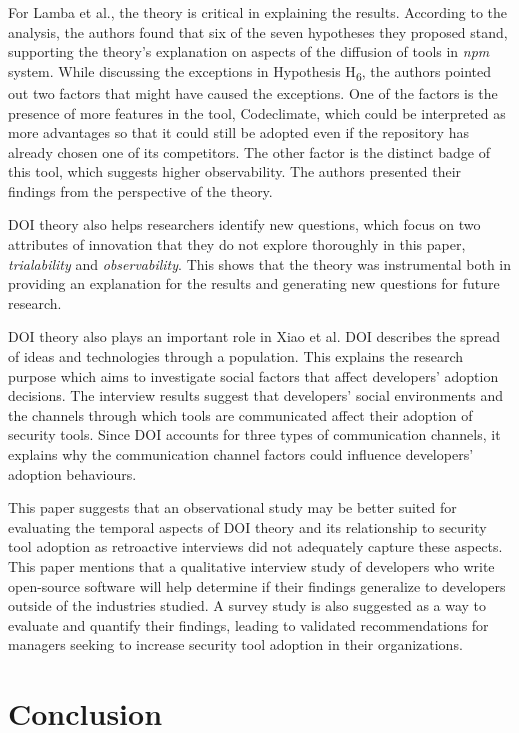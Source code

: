 \documentclass[journal,12pt,onecolumn,]{IEEEtran}
\begin{document}
For Lamba et al., the theory is critical in explaining the results. According to the analysis, the authors found that six of the seven hypotheses they proposed
stand, supporting the theory's explanation on aspects of the diffusion of tools in \textit{npm} system.
While discussing the exceptions in Hypothesis H\textsubscript{6}, the authors pointed out two factors that might have caused the exceptions. One of the factors is the presence of more features in the tool, Codeclimate, which could be interpreted as more advantages so that it could still be adopted even if the repository has already chosen one of its competitors. 
The other factor is the distinct badge of this tool, which suggests higher observability.
The authors presented their findings from the perspective of the theory.

DOI theory also helps researchers identify new questions, which focus on two attributes of innovation that they do not explore thoroughly in this paper, \textit{trialability} and \textit{observability}.
This shows that the theory was instrumental both in providing an explanation for the results and generating new questions for future research.

DOI theory also plays an important role in Xiao et al. DOI describes the spread of ideas and technologies through a population. This explains the research purpose which aims to investigate social factors that affect developers' adoption decisions.
The interview results suggest that developers' social environments and the channels through which tools are communicated affect their adoption of security tools. Since DOI accounts for three types of communication channels, it explains why the communication channel factors could influence developers' adoption behaviours.

This paper suggests that an observational study may be better suited for evaluating the temporal aspects of DOI theory and its relationship to security tool adoption as retroactive interviews did not adequately capture these aspects. This paper mentions that a qualitative interview study of developers who write open-source software will help determine if their findings generalize to developers outside of the industries studied.
A survey study is also suggested as a way to evaluate and quantify their findings, leading to validated recommendations for managers seeking to increase security tool adoption in their organizations.
\section{Conclusion}
\end{document}
